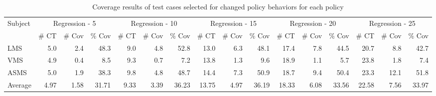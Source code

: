 \begin{table}[htbp]
  \centering
  \caption{Coverage results of test cases selected for changed policy behaviors for each policy}
  	\vspace{-8pt}   
    \begin{tabular}{|l|r|r|r||r|r|r||r|r|r||r|r|r||r|r|r|}
\hline
     \multirow{2}{*}{Subject} & \multicolumn{3}{|c||}{Regression - 5} & \multicolumn{3}{|c||}{Regression - 10} & \multicolumn{3}{|c||}{Regression - 15} & \multicolumn{3}{|c||}{Regression - 20} & \multicolumn{3}{|c|}{Regression - 25} \\\cline{2-16}
       & \# CT & \# Cov & \% Cov & \# CT & \# Cov & \% Cov & \# CT & \# Cov & \% Cov & \# CT & \# Cov & \% Cov & \# CT & \# Cov & \% Cov \\\hline\hline
    LMS   & 5.0   & 2.4   & 48.3  & 9.0   & 4.8   & 52.8  & 13.0  & 6.3   & 48.1  & 17.4  & 7.8   & 44.5  & 20.7  & 8.8   & 42.7 \\\hline
    VMS   & 4.9   & 0.4   & 8.5   & 9.3   & 0.7   & 7.2   & 13.8  & 1.3   & 9.6   & 18.9  & 1.1   & 5.7   & 23.8  & 1.8   & 7.4 \\\hline
    ASMS  & 5.0   & 1.9   & 38.3  & 9.8   & 4.8   & 48.7  & 14.4  & 7.3   & 50.9  & 18.7  & 9.4   & 50.4  & 23.3  & 12.1  & 51.8 \\\hline\hline
    Average & 4.97  & 1.58  & 31.71 & 9.33  & 3.39  & 36.23 & 13.75 & 4.97  & 36.19 & 18.33 & 6.08  & 33.56 & 22.58 & 7.56  & 33.97 \\\hline

    \end{tabular}%
  \label{tab:cov-results}%
\end{table}%


